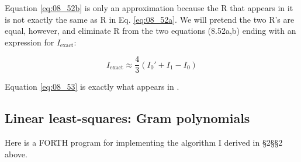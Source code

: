 Equation \ref{eq:08_52b} is only an approximation because the R that appears in it is not exactly the same as R in Eq. \ref{eq:08_52a}. We will pretend the two R’s are equal, however, and eliminate R from the two equations (8.52a,b) ending with an expression for $I_{\text{exact}}$:

\begin{equation}\label{eq:08_53}
    I_{\text{exact}} \approx \frac{4}{3}(I_{0}' + I_{1} - I_{0})
\end{equation}

Equation \ref{eq:08_53} is exactly what appears in .


\subsection{Linear least-squares: Gram polynomials}
Here is a FORTH program for implementing the algorithm
I derived in \S2\S\S2 above.

